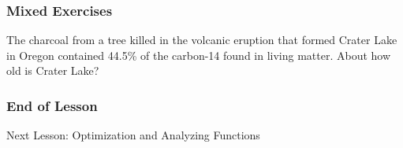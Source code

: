 \documentclass[xcolor=dvipsnames]{beamer}
\begin{document}
\begin{frame}
  \frametitle{Mixed Exercises}
  {\ubung} The charcoal from a tree killed in the volcanic eruption
  that formed Crater Lake in Oregon contained 44.5\% of the carbon-14
  found in living matter. About how old is Crater Lake?
\end{frame}

\begin{frame}
  \frametitle{End of Lesson}
Next Lesson: Optimization and Analyzing Functions
\end{frame}
\end{document}
